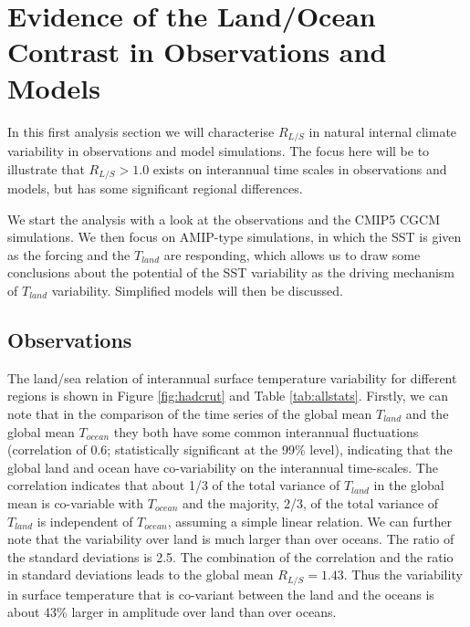 \chapter{Evidence of the Land/Ocean Contrast in Observations and Models} 

\label{evidence} 


In this first analysis section we will characterise $R_{L/S}$  in natural 
internal climate variability in observations and model simulations. The focus 
here will be to illustrate that $R_{L/S} > 1.0$  exists on interannual time 
scales in observations and models, but has some significant regional 
differences.

We start the analysis with a look at the observations and the CMIP5 CGCM 
simulations. We then focus on AMIP-type simulations, in which the SST is given 
as the forcing and the $T_{land}$ are responding, which allows us to draw some 
conclusions about the potential of the SST variability as the driving mechanism 
of $T_{land}$ variability. Simplified models will then be discussed.


\section{Observations}

The land/sea relation of interannual surface temperature variability for 
different regions is shown in Figure \ref{fig:hadcrut} and Table 
\ref{tab:allstats}. Firstly, we can note that in the comparison of the time 
series of the global mean $T_{land}$ and the global mean $T_{ocean}$ they both 
have some common interannual fluctuations (correlation of	0.6; statistically 
significant at the 99\% level), indicating that the global land and ocean have 
co-variability on the interannual time-scales.  The correlation indicates that 
about 1/3 of the total variance of  $T_{land}$ in the global mean is co-variable 
with $T_{ocean}$ and the majority, 2/3, of the total variance of $T_{land}$ is 
independent of $T_{ocean}$, assuming a simple linear relation. We can further 
note that the variability over land is much larger than over  oceans. The ratio 
of the standard deviations is 2.5. The combination of the correlation and the 
ratio in standard deviations leads to the global mean $R_{L/S} =1.43$. Thus the 
variability in surface temperature that is co-variant between the land and the 
oceans is  about 43\% larger in amplitude over land than over oceans.

